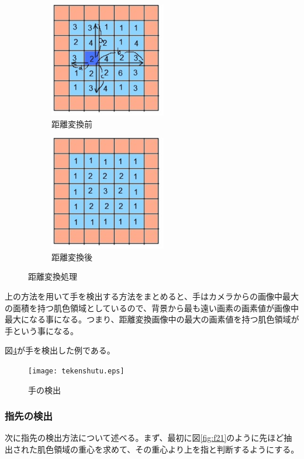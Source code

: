 \documentclass[11pt,a4j, titlepage]{jarticle} %
\begin{document}
\begin{figure}[H]
	\centering
	\begin{subfigure}{0.4\columnwidth}
		\centering
		\includegraphics[width=\columnwidth,height=5cm]{henkanmae.eps}
		\caption{距離変換前}
		\label{fig:henkanmae}
	\end{subfigure}
	\begin{subfigure}{0.4\columnwidth}
		\centering
		\includegraphics[width=\columnwidth,height=5cm]{henkango.eps}
		\caption{距離変換後}
		\label{fig:henkango}
	\end{subfigure}
	\caption{距離変換処理}
	\label{fig:f15}
\end{figure}

上の方法を用いて手を検出する方法をまとめると、手はカメラからの画像中最大の面積を持つ肌色領域としているので、背景から最も遠い画素の画素値が画像中最大になる事になる。つまり、距離変換画像中の最大の画素値を持つ肌色領域が手という事になる。

図\ref{fig:f16}が手を検出した例である。

\begin{figure}[H]
	\centering
	\texttt{[image: tekenshutu.eps]}
	\caption{手の検出}
	\label{fig:f16}
\end{figure}

\subsubsection{指先の検出}
次に指先の検出方法について述べる。まず、最初に図\ref{fig:f21}のように先ほど抽出された肌色領域の重心を求めて、その重心より上を指と判断するようにする。
\end{document}
